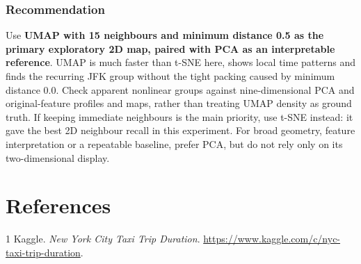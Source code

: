\documentclass{article}
\begin{document}
\subsubsection{Recommendation}

Use \textbf{UMAP with 15 neighbours and minimum distance 0.5 as the primary
exploratory 2D map, paired with PCA as an interpretable reference}.
UMAP is much faster than t-SNE here, shows local time patterns and finds
the recurring JFK group without the tight packing caused by minimum
distance 0.0. Check apparent nonlinear groups against nine-dimensional
PCA and original-feature profiles and maps, rather than treating UMAP
density as ground truth. If keeping immediate neighbours is the main
priority, use t-SNE instead: it gave the best 2D neighbour recall in this
experiment. For broad geometry, feature interpretation or a repeatable
baseline, prefer PCA, but do not rely only on its two-dimensional display.

\section*{References}

\small

\begin{thebibliography}{1}
Kaggle. \emph{New York City Taxi Trip Duration}.
\url{https://www.kaggle.com/c/nyc-taxi-trip-duration}.
\end{thebibliography}
\end{document}

